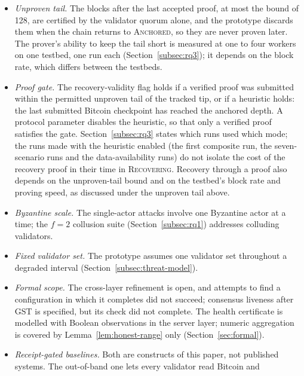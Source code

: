 \begin{itemize}
  Bitcoin (thirty times mainnet; the conversion to mainnet cadence is model-based,
  see the exposure paragraph above) and single-bridge DA trust, and the backfill
  gate rests on a quorum-reported contiguous height, not a proof of retrievability
  (Section~\ref{subsec:sim-to-real}).
  \item \emph{Unproven tail.} The blocks after the last accepted proof, at most the bound of 128, are certified by
  the validator quorum alone, and the prototype discards them when the chain returns to \textsc{Anchored}, so they are never proven
  later. The prover's ability to keep the tail short is measured at one to four workers on one testbed, one run each
  (Section~\ref{subsec:rq3}); it depends on the block rate, which differs between the testbeds.
  \item \emph{Proof gate.} The recovery-validity flag holds if a verified
  proof was submitted within the permitted unproven tail of the tracked tip,
  or if a heuristic holds: the last submitted Bitcoin checkpoint has reached
  the anchored depth. A protocol parameter disables the heuristic, so that
  only a verified proof satisfies the gate. Section~\ref{subsec:rq3} states which runs used which mode; the runs made with
  the heuristic enabled (the first composite run, the seven-scenario runs and the
  data-availability runs) do not isolate the cost of the recovery proof in their
  time in \textsc{Recovering}.
  Recovery through a proof also depends on the unproven-tail bound and on the
  testbed's block rate and proving speed, as discussed under the unproven tail
  above.
  \item \emph{Byzantine scale.} The single-actor attacks involve one
  Byzantine actor at a time; the $f{=}2$ collusion suite
  (Section~\ref{subsec:rq1}) addresses colluding validators.
  \item \emph{Fixed validator set.} The prototype assumes one validator set
  throughout a degraded interval (Section~\ref{subsec:threat-model}).
  \item \emph{Formal scope.} The cross-layer refinement is open, and attempts to
  find a configuration in which it completes did not succeed; consensus liveness
  after GST is specified, but its check did not complete. The health certificate is
  modelled with Boolean observations in the server layer; numeric aggregation is
  covered by Lemma~\ref{lem:honest-range} only (Section~\ref{sec:formal}).
  \item \emph{Receipt-gated baselines.} Both are constructs of this paper, not
  published systems. The out-of-band one lets every validator read Bitcoin and

\end{itemize}
